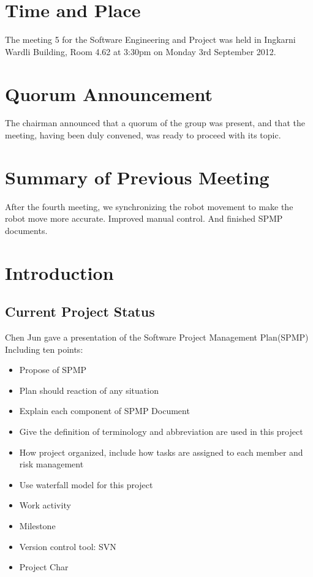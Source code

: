 \documentclass[11pt, a4paper]{article}
\begin{document}
\section{Time and Place}
The meeting 5 for the Software Engineering and Project was held in Ingkarni Wardli Building, Room 4.62 at 3:30pm on Monday 3rd September 2012.

\section{Quorum Announcement}
The chairman announced that a quorum of the group was present, and that the meeting, having been duly convened, was ready to proceed with its topic.

\section{Summary of Previous Meeting}
After the fourth meeting, we synchronizing the robot movement to make the robot move more accurate. Improved manual control. And finished SPMP documents.



\section{Introduction}

\subsection{Current Project Status}
Chen Jun gave a presentation of the Software Project Management Plan(SPMP) Including ten points:
\begin{itemize}
\item Propose of SPMP
\item Plan should reaction of any situation
\item Explain each component of SPMP Document
\item Give the definition of terminology and abbreviation are used in this project
\item How project organized, include how tasks are assigned to each member and risk management
\item Use waterfall model for this project
\item Work activity
\item Milestone
\item Version control tool: SVN
\item Project Char
\end{itemize}
\end{document}
